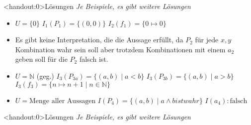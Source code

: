 {\begin{frame}<handout:0>{Lösungen}
	\textit{Je Beispiele, es gibt weitere Lösungen}
	\begin{itemize}[<+- | alert@+>]
		\item $U=\{0\}$ \only<1>{\\}\only<2->{; }
		      $I_1(P_1) = \{(0,0)\}$ 
		      $I_2(f_1) = \{0\mapsto 0\}$
		\item Es gibt keine Interpretation, die die Aussage erfüllt, da $P_2$ für jede $x,y$ Kombination wahr sein soll aber trotzdem Kombinationen mit einem $a_2$ geben soll für die $P_2$ falsch ist.
		\item $U=\mathbb{N}$ (geg.) \only<3>{\\}\only<4->{; }
		      $I_3(P_{3a}) = \{(a,b)\mid a < b\}$ \only<4->{; }
		      $I_3(P_{3b}) = \{(a,b)\mid a > b\}$ \only<4->{; }
		      $I_3(f_3) = \{n\mapsto n+1 \mid n\in \mathbb{N}\}$
		\item $U=\text{Menge aller Aussagen}$ \only<5->{; }
		      $I(P_4)=\{(a,b)\mid a \land b ist wahr\}$ \only<5->{; }
		      $I(a_4): \text{falsch}$
	\end{itemize}

\end{frame}

\begin{frame}<handout:0>{Lösungen}
	\textit{Je Beispiele, es gibt weitere Lösungen}
	\par
	\par
\end{frame}

}
